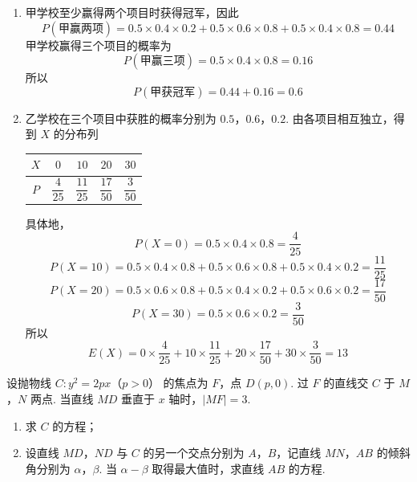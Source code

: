 \begin{solution}
\begin{enumerate}
\item 甲学校至少赢得两个项目时获得冠军，因此
\[
P(\text{甲赢两项})=0.5\times0.4\times0.2+0.5\times0.6\times0.8+0.5\times0.4\times0.8=0.44
\]
甲学校赢得三个项目的概率为
\[
P(\text{甲赢三项})=0.5\times0.4\times0.8=0.16
\]
所以
\[
P(\text{甲获冠军})=0.44+0.16=0.6
\]
\item 乙学校在三个项目中获胜的概率分别为 \(0.5\)，\(0.6\)，\(0.2\). 由各项目相互独立，得到 \(X\) 的分布列
\begin{center}
\begin{tabular}{c|cccc}
\(X\) & \(0\) & \(10\) & \(20\) & \(30\) \\ \hline
\(P\) & \(\dfrac4{25}\) & \(\dfrac{11}{25}\) & \(\dfrac{17}{50}\) & \(\dfrac3{50}\)
\end{tabular}
\end{center}
具体地，
\[
P(X=0)=0.5\times0.4\times0.8=\frac4{25}
\]
\[
P(X=10)=0.5\times0.4\times0.8+0.5\times0.6\times0.8+0.5\times0.4\times0.2=\frac{11}{25}
\]
\[
P(X=20)=0.5\times0.6\times0.8+0.5\times0.4\times0.2+0.5\times0.6\times0.2=\frac{17}{50}
\]
\[
P(X=30)=0.5\times0.6\times0.2=\frac3{50}
\]
所以
\[
E(X)=0\times\frac4{25}+10\times\frac{11}{25}+20\times\frac{17}{50}+30\times\frac3{50}=13
\]
\end{enumerate}
\end{solution}

\begin{problem}
设抛物线 \(C:y^2=2px\)（\(p>0\)） 的焦点为 \(F\)，点 \(D\left( p,0 \right)\). 过 \(F\) 的直线交 \(C\) 于 \(M\)，\(N\) 两点. 当直线 \(MD\) 垂直于 \(x\) 轴时，\(|MF|=3\).

\begin{enumerate}
\item 求 \(C\) 的方程；
\item 设直线 \(MD\)，\(ND\) 与 \(C\) 的另一个交点分别为 \(A\)，\(B\)，记直线 \(MN\)，\(AB\) 的倾斜角分别为 \(\alpha\)，\(\beta\). 当 \(\alpha-\beta\) 取得最大值时，求直线 \(AB\) 的方程.
\end{enumerate}
\end{problem}

